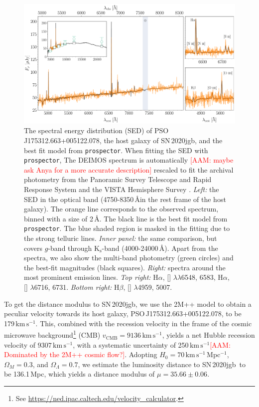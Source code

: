 \documentclass[twocolumn]{aastex631}
\newcommand{\sn}{SN\,2020jgb}
\newcommand{\kms}{$\mathrm{km}\,\mathrm{s}^{-1}$}
\newcommand{\adam}[1]{\textcolor{red}{[AAM: #1]}}
\begin{document}
\begin{figure}
    \centering
    \includegraphics[width=\textwidth]{DEIMOS_20jgb.pdf}
    \caption{The spectral energy distribution (SED) of PSO J175312.663+005122.078, the host galaxy of \sn, and the best fit model from \texttt{prospector}. When fitting the SED with \texttt{prospector}, The DEIMOS spectrum is automatically \adam{maybe ask Anya for a more accurate description} rescaled to fit the archival photometry from the Panoramic Survey Telescope and Rapid Response System \citep[Pan-STARRS;][{\it r, i, z} Kron magnitudes]{PS1_2016}  and the VISTA Hemisphere Survey \citep[VHS;][J and $\mathrm{K}_\mathrm{s}$ Petrosian magnitudes]{VHS_2013}. {\it Left:} the SED in the optical band (4750-8350\,\AA in the rest frame of the host galaxy). The orange line corresponds to the observed spectrum, binned with a size of 2\,\AA. The black line is the best fit model from \texttt{prospector}. The blue shaded region is masked in the fitting due to the strong telluric lines. {\it Inner panel:} the same comparison, but covers $g$-band through $\mathrm{K_s}$-band (4000-24000\,\AA). Apart from the spectra, we also show the multi-band photometry (green circles) and the best-fit magnitudes (black squares). {\it Right:} spectra around the most prominent emission lines. {\it Top right:} H$\alpha$, [] $\lambda\lambda$6548, 6583, H$\alpha$, [] $\lambda$6716, 6731. {\it Bottom right:} H$\beta$, [] $\lambda$4959, 5007.}
    \label{fig:host_spec}
\end{figure}

To get the distance modulus to \sn, we use the 2M++ model \citep{Carrick2015_2M++} to obtain a peculiar velocity towards its host galaxy, PSO\,J175312.663+005122.078, to be 179\,\kms. This, combined with the recession velocity in the frame of the cosmic microwave background\footnote{See \url{https://ned.ipac.caltech.edu/velocity_calculator}.} (CMB) $v_\mathrm{CMB}=9136$\,\kms, yields a net Hubble recession velocity of $9307$\,\kms, with a systematic uncertainty of 250\,\kms \adam{Dominated by the 2M++ cosmic flow?}. Adopting $H_0=70$\,\kms\,Mpc$^{-1}$, $\Omega_M=0.3$, and $\Omega_\Lambda=0.7$, we estimate the luminosity distance to \sn\ to be 136.1\,Mpc, which yields a distance modulus of $\mu=35.66\pm0.06$.
\end{document}
